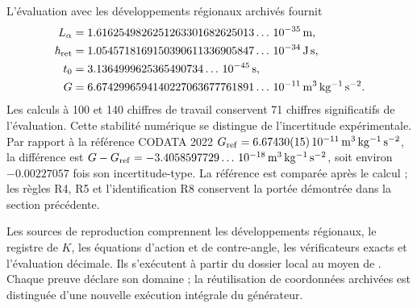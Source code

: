 L'évaluation avec les développements régionaux archivés fournit
\begin{align*}
 L_\alpha&=1.6162549826251263301682625013\ldots\,10^{-35}\,\mathrm m,\\
 \hbar_{\rm ret}&=1.0545718169150390611336905847\ldots\,10^{-34}\,
                    \mathrm{J\,s},\\
 t_0&=3.1364999625365490734\ldots\,10^{-45}\,\mathrm s,\\
 G&=6.6742996594140227063677761891\ldots\,10^{-11}\,
                    \mathrm{m^3\,kg^{-1}\,s^{-2}}.
\end{align*}
Les calculs à 100 et 140 chiffres de travail conservent 71 chiffres significatifs de l'évaluation. Cette stabilité numérique se distingue de l'incertitude expérimentale. Par rapport à la référence CODATA 2022 \(G_{\rm ref}=6.67430(15)\,10^{-11}\,\mathrm{m^3\,kg^{-1}\,s^{-2}}\), la différence est \(G-G_{\rm ref}=-3.4058597729\ldots\,10^{-18}\,
\mathrm{m^3\,kg^{-1}\,s^{-2}}\), soit environ \(-0.00227057\) fois son incertitude-type. La référence est comparée après le calcul ; les règles R4, R5 et l'identification R8 conservent la portée démontrée dans la section précédente.

Les sources de reproduction comprennent les développements régionaux, le
registre de \(K\), les équations d'action et de contre-angle, les
vérificateurs exacts et l'évaluation décimale. Ils s'exécutent à partir du
dossier local  au moyen de
. Chaque preuve déclare son domaine ; la
réutilisation de coordonnées archivées est distinguée d'une nouvelle
exécution intégrale du générateur.
